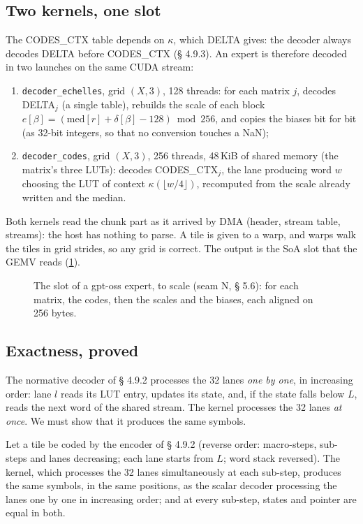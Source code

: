 \subsection{Two kernels, one slot}

The CODES\_CTX table depends on $\kappa$, which DELTA gives: the decoder always decodes DELTA before CODES\_CTX (§ 4.9.3). An expert is therefore decoded in two launches on the same CUDA stream:
\begin{enumerate}
\item \texttt{decoder\_echelles}, grid $(X, 3)$, 128 threads: for each matrix $j$, decodes DELTA$_j$ (a single table), rebuilds the scale of each block $e[\beta] = (\text{med}[r] + \delta[\beta] - 128) \bmod 256$, and copies the biases bit for bit (as 32-bit integers, so that no conversion touches a NaN);
\item \texttt{decoder\_codes}, grid $(X, 3)$, 256 threads, 48\,KiB of shared memory (the matrix's three LUTs): decodes CODES\_CTX$_j$, the lane producing word $w$ choosing the LUT of context $\kappa(\lfloor w/4 \rfloor)$, recomputed from the scale already written and the median.
\end{enumerate}
Both kernels read the chunk part as it arrived by DMA (header, stream table, streams): the host has nothing to parse. A tile is given to a warp, and warps walk the tiles in grid strides, so any grid is correct. The output is the SoA slot that the GEMV reads (\cref{fig:t2n-soa}).

\begin{figure}[!htbp]
\centering
\SchemaNoySoA
\caption[The SoA slot of a gpt-oss expert, to scale]{The slot of a gpt-oss expert, to scale (seam N, § 5.6): for each matrix, the codes, then the scales and the biases, each aligned on 256 bytes.}
\label{fig:t2n-soa}
\end{figure}

\subsection{Exactness, proved}

The normative decoder of § 4.9.2 processes the 32 lanes \emph{one by one}, in increasing order: lane $l$ reads its LUT entry, updates its state, and, if the state falls below $L$, reads the next word of the shared stream. The kernel processes the 32 lanes \emph{at once}. We must show that it produces the same symbols.

\begin{theoreme}\label{thm:t2n-warp}
Let a tile be coded by the encoder of § 4.9.2 (reverse order: macro-steps, sub-steps and lanes decreasing; each lane starts from $L$; word stack reversed). The kernel, which processes the 32 lanes simultaneously at each sub-step, produces the same symbols, in the same positions, as the scalar decoder processing the lanes one by one in increasing order; and at every sub-step, states and pointer are equal in both.
\end{theoreme}

